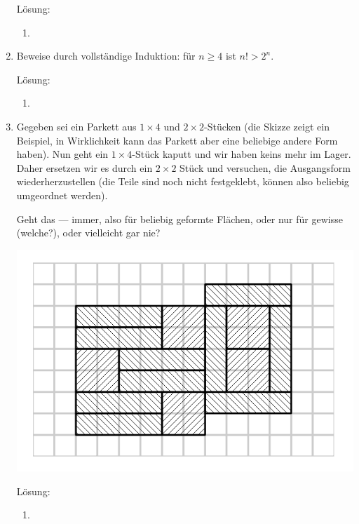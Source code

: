 \documentclass[../main.tex]{subfiles}
\begin{document}
\begin{enumerate}
	      Lösung:
	      \begin{enumerate}
		      \item
	      \end{enumerate}
	\item Beweise durch vollständige Induktion: für \(
	      n \geq 4
	      \) ist \(
	      n! > 2^n
	      \).

	      Lösung:
	      \begin{enumerate}
		      \item
	      \end{enumerate}
	\item Gegeben sei ein Parkett aus \(
	      1 \times 4
	      \) und \(
	      2 \times 2
	      \)-Stücken (die Skizze zeigt ein Beispiel,
	      in Wirklichkeit kann das Parkett aber eine beliebige andere Form haben).
	      Nun geht ein \(
	      1 \times 4
	      \)-Stück kaputt und wir haben keins mehr im Lager.
	      Daher ersetzen wir es durch ein \(
	      2 \times 2
	      \) Stück und versuchen, die Ausgangsform wiederherzustellen
	      (die Teile sind noch nicht festgeklebt, können also beliebig umgeordnet werden).

	      Geht das — immer, also für beliebig geformte Flächen,
	      oder nur für gewisse (welche?), oder vielleicht gar nie?

	      \includegraphics[scale=0.5]{tiles}

	      Lösung:
	      \begin{enumerate}
		      \item
	      \end{enumerate}
\end{enumerate}
\end{document}
